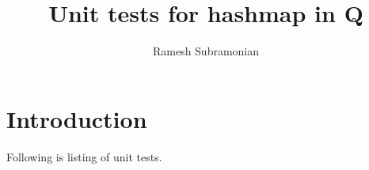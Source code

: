 \documentclass[letterpaper,12pt]{article}
\begin{document}
\author{Ramesh Subramonian}
\title{Unit tests for hashmap in Q}
\maketitle
\thispagestyle{fancy}
\lhead{}
\chead{}
\rhead{}
\cfoot{}
\rfoot{{\small \thepage}}

\section{Introduction}
Following is listing of unit tests.

\end{document}
